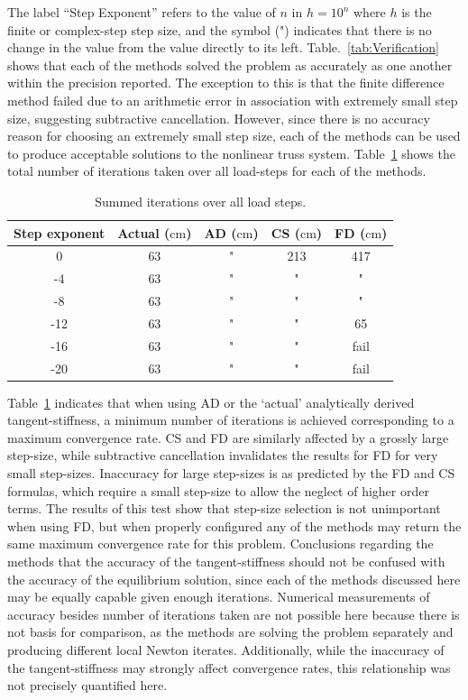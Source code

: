 \documentclass[preprint,12pt]{elsarticle}
\begin{document}
%
The label ``Step Exponent'' refers to the value of $n$ in $h=10^{n}$ where $h$ is the finite or complex-step step size, and the symbol (") indicates that there is no change in the value from the value directly to its left.  Table.~\ref{tab:Verification} shows that each of the methods solved the problem as accurately as one another within the precision reported. The exception to this is that the finite difference method failed due to an arithmetic error in association with extremely small step size, suggesting subtractive cancellation. However, since there is no accuracy reason for choosing an extremely small step size, each of the methods can be used to produce acceptable solutions to the nonlinear truss system. Table~\ref{tab:ConvergenceStudy} shows the total number of iterations taken over all load-steps for each of the methods. 
%
\begin{table}[tbp]    
  \centering
  \caption{Summed iterations over all load steps.} \label{tab:ConvergenceStudy}   
        \begin{tabular}{c c c c c}
         \toprule
         Step exponent & Actual ($\si{\centi\meter}$) & AD ($\si{\centi\meter}$) & CS ($\si{\centi\meter}$) & FD ($\si{\centi\meter}$)\\ 
        \midrule
        0 & 63 & " & 213 & 417\\
        -4 & 63 & " & " & "\\
        -8 & 63& " & " & "\\
        -12 &63& " & " &  65\\
        -16 &63& " & " & fail\\
        -20 &63& " & " & fail\\
        \bottomrule
    \end{tabular}
\end{table}
%
Table~\ref{tab:ConvergenceStudy} indicates that when using AD or the `actual' analytically derived tangent-stiffness, a minimum number of iterations is achieved corresponding to a maximum convergence rate. CS and FD are similarly affected by a grossly large step-size, while subtractive cancellation invalidates the results for FD for very small step-sizes. Inaccuracy for large step-sizes is as predicted by the FD and CS formulas, which require a small step-size to allow the neglect of higher order terms. The results of this test show that step-size selection is not unimportant when using FD, but when properly configured any of the methods may return the same maximum convergence rate for this problem.  Conclusions regarding the methods that the accuracy of the tangent-stiffness should not be confused with the accuracy of the equilibrium solution, since each of the methods discussed here may be equally capable given enough iterations. Numerical measurements of accuracy besides number of iterations taken are not possible here because there is not basis for comparison, as the methods are solving the problem separately and producing different local Newton iterates. Additionally, while the inaccuracy of the tangent-stiffness may strongly affect convergence rates, this relationship was not precisely quantified here.
\end{document}
